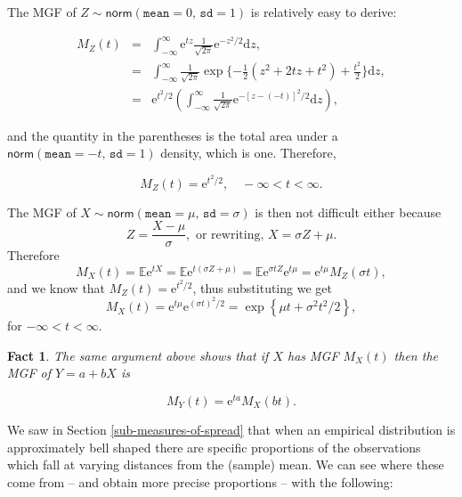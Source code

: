 \documentclass[]{book}
\numberwithin{equation}{chapter}
\numberwithin{figure}{chapter}
\theoremstyle{plain}
\newtheorem{fact}[thm]{Fact}
\theoremstyle{definition}
\theoremstyle{remark}
\theoremstyle{definition}
\theoremstyle{definition}
\theoremstyle{remark}
\let\BeginKnitrBlock\begin \let\EndKnitrBlock\end
\begin{document}
The MGF of \(Z\sim\mathsf{norm}(\mathtt{mean}=0,\,\mathtt{sd}=1)\) is
relatively easy to derive:

\begin{eqnarray*}
M_{Z}(t) & = & \int_{-\infty}^{\infty}\mathrm{e}^{tz}\frac{1}{\sqrt{2\pi}}\mathrm{e}^{-z^{2}/2}\mathrm{d} z,\\
 & = & \int_{-\infty}^{\infty}\frac{1}{\sqrt{2\pi}}\exp \{ -\frac{1}{2}\left(z^{2}+2tz+t^{2}\right)+\frac{t^{2}}{2} \} \mathrm{d} z,\\
 & = & \mathrm{e}^{t^{2}/2}\left(\int_{-\infty}^{\infty}\frac{1}{\sqrt{2\pi}}\mathrm{e}^{-[z-(-t)]^{2}/2}\mathrm{d} z\right),
\end{eqnarray*}

and the quantity in the parentheses is the total area under a
\(\mathsf{norm}(\mathtt{mean}=-t,\,\mathtt{sd}=1)\) density, which is
one. Therefore,

\begin{equation}
M_{Z}(t)=\mathrm{e}^{t^{2}/2},\quad -\infty < t < \infty.
\end{equation}

\bigskip

\BeginKnitrBlock{example}
\protect\hypertarget{ex:unnamed-chunk-263}{}{\label{ex:unnamed-chunk-263}}The
MGF of \(X\sim\mathsf{norm}(\mathtt{mean}=\mu,\,\mathtt{sd}=\sigma)\) is
then not difficult either because \[ Z=\frac{X-\mu}{\sigma},\mbox{ or
rewriting, }X=\sigma Z+\mu.  \] Therefore \[
M_{X}(t)=\mathbb{E}\mathrm{e}^{tX}=\mathbb{E}\mathrm{e}^{t(\sigma
Z+\mu)}=\mathbb{E}\mathrm{e}^{\sigma
tZ}\mathrm{e}^{t\mu}=\mathrm{e}^{t\mu}M_{Z}(\sigma t), \] and we know
that \(M_{Z}(t)=\mathrm{e}^{t^{2}/2}\), thus substituting we get \[
M_{X}(t)=\mathrm{e}^{t\mu}\mathrm{e}^{(\sigma t)^{2}/2}=\exp\left\{
\mu t+\sigma^{2}t^{2}/2\right\} , \] for \(-\infty<t<\infty\).
\EndKnitrBlock{example}

\bigskip

\begin{fact}
The same argument above shows that if \(X\) has MGF \(M_{X}(t)\) then
the MGF of \(Y=a+bX\) is

\begin{equation}
M_{Y}(t)=\mathrm{e}^{ta}M_{X}(bt).
\end{equation}
\end{fact}

\bigskip

\BeginKnitrBlock{example}[The 68-95-99.7 Rule]
\protect\hypertarget{ex:unnamed-chunk-265}{}{\label{ex:unnamed-chunk-265}
\iffalse (The 68-95-99.7 Rule) \fi }We saw in Section
\ref{sub-measures-of-spread} that when an empirical distribution is
approximately bell shaped there are specific proportions of the
observations which fall at varying distances from the (sample) mean. We
can see where these come from -- and obtain more precise proportions --
with the following:
\EndKnitrBlock{example}
\end{document}
